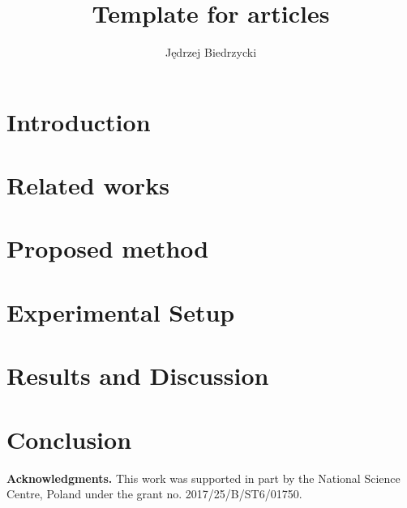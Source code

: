 \documentclass{article}
\begin{document}
    \title{Template for articles}
    \author{Jędrzej Biedrzycki}%

    \maketitle

    \begin{abstract}
        \lipsum[1]\cite{exBook}
    \end{abstract}

    \section{Introduction}\label{sec:introduction}
    \lipsum[2]

    \section{Related works}\label{sec:related-works}
    \lipsum[3]

    \section{Proposed method}\label{sec:proposed-method}
    \lipsum[4]

    \section{Experimental Setup}\label{sec:experimental-setup}
    \lipsum[5]

    \section{Results and Discussion}\label{sec:results-and-discussion}
    \lipsum[6]

    \section{Conclusion}\label{sec:conclusion}
    \lipsum[7]

    \textbf{Acknowledgments.} This work was supported in part by the National Science Centre, Poland under the grant no. 2017/25/B/ST6/01750.

    
    
\end{document}
